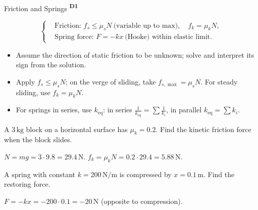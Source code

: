 ﻿\documentclass[12pt,a4paper]{article}
\providecommand{\KPFormulas}{}
\providecommand{\KPHeuristics}{}
\providecommand{\KPProblems}{}
\newcommand{\DOne}{\texorpdfstring{\textsuperscript{\textbf{D1}}}{ D1}}
\begin{document}
\begin{KnowledgePoint}{Friction and Springs \DOne}
  \KPFormulas
  \begin{formulabox}
  \[
  \left\{\begin{aligned}
    &\text{Friction: } f_s\le \mu_s N\ \text{(variable up to max)},\quad f_k=\mu_k N,\\
    &\text{Spring force: } F=-kx\ \text{(Hooke) within elastic limit}.
  \end{aligned}\right.
  \]
  \end{formulabox}

  \KPHeuristics
\begin{heuristicsbox}
\begin{itemize}[leftmargin=*]
  \item Assume the direction of static friction to be unknown; solve and interpret its sign from the solution.
  \item Apply $f_s\le \mu_s N$; on the verge of sliding, take $f_{s,\max}=\mu_s N$. For steady sliding, use $f_k=\mu_k N$.
  \item For springs in series, use $k_{\text{eq}}$: in series $\tfrac{1}{k_{\text{eq}}}=\sum \tfrac{1}{k_i}$, in parallel $k_{\text{eq}}=\sum k_i$.
\end{itemize}
\end{heuristicsbox}

  \KPProblems
\begin{cheatproblem}
  A $3\,\text{kg}$ block on a horizontal surface has $\mu_k=0.2$. Find the kinetic friction force when the block slides.
\begin{solutionbox}
  $N=mg=3\cdot9.8=29.4\,\text{N}$. $f_k=\mu_k N=0.2\cdot29.4=5.88\,\text{N}$.
\end{solutionbox}
\end{cheatproblem}
\begin{cheatproblem}
  A spring with constant $k=200\,\text{N/m}$ is compressed by $x=0.1\,\text{m}$. Find the restoring force.
\begin{solutionbox}
  $F=-kx=-200\cdot0.1=-20\,\text{N}$ (opposite to compression).
\end{solutionbox}
\end{cheatproblem}
\end{KnowledgePoint}
\end{document}
